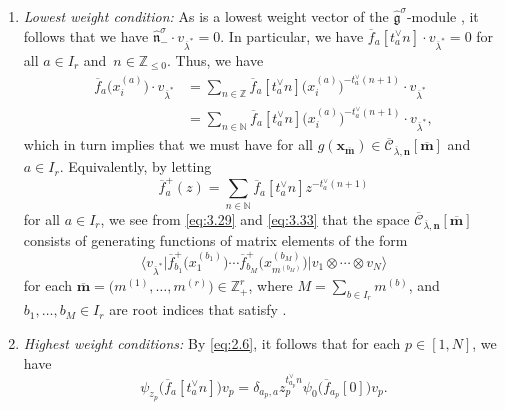 \documentclass[10pt,a4paper]{amsart}
\numberwithin{equation}{section}
\begin{document}
\begin{enumerate}
\item[$(2)$] \emph{Lowest weight condition:} As  is a lowest weight vector of the $\widehat{ \mathfrak{g}}^{\sigma}$-module , it follows that we have $\widehat{ \mathfrak{n}}_-^{\sigma}\cdot v_{\overline{ \lambda}^*}=0$. In particular, we have $\overline{f}_a [t_a^{\vee}n]\cdot v_{ \overline{\lambda}^*}=0$ for all $a\in I_r$ and~${n\in\mathbb{ Z}_{\leq0}}$. Thus, we have
\begin{align}
\overline{f}_a\bigl(x_i^{(a)}\bigr)\cdot v_{\overline{\lambda}^*}
&=\sum_{n\in\mathbb{Z}}\overline{f}_a[t_a^{\vee}n]\bigl(x_i^{(a)}\bigr)^{-t_a^{\vee}(n+1)}\cdot v_{\overline{\lambda}^*}\nonumber\\
&=\sum_{n\in\mathbb{N}}\overline{f}_a[t_a^{\vee}n]\bigl(x_i^{(a)}\bigr)^{-t_a^{\vee}(n+1)}\cdot v_{\overline{\lambda}^*},\label{eq:3.33}
\end{align}
which in turn implies that we must have
for all $g(\mathbf{x}_{\overline{\mathbf{m}}})\in\overline{ \mathcal{C}}_{\overline{\lambda},\mathbf{n}}[\overline{ \mathbf{m}}]$ and $a\in I_r$. Equivalently, by letting
\begin{equation}\label{eq:3.35}
\overline{f}_a^+(z)=
\sum_{n\in\mathbb{N}}\overline{f}_a[t_a^{\vee}n]z^{-t_a^{\vee}(n+1)}
\end{equation}
for all $a\in I_r$, we see from \eqref{eq:3.29} and \eqref{eq:3.33} that the space $\overline{\mathcal{C}}_{ \overline{\lambda},\mathbf{n}}[\overline{\mathbf{m}}]$ consists of generating functions of matrix elements of the form
\begin{equation}\label{eq:3.36}
\big\langle v_{\overline{\lambda}^*}\big|\overline{f}_{b_1}^+\bigl(x_1^{(b_1)}\bigr)\cdots\overline{f}_{b_M}^+\bigl(x_{m^{(b_M)}}^{(b_M)}\bigr) \big|v_1\otimes\cdots\otimes v_N\big\rangle
\end{equation}
for each $\overline{\mathbf{m}}=\bigl(m^{(1)},\dots,m^{(r)}\bigr)\in \mathbb{Z}_+^r$, where $M=\sum_{b\in I_r}m^{(b)}$, and $b_1,\dots,b_M\in I_r$ are root indices that satisfy .
\item[$(3)$] \emph{Highest weight conditions:} By \eqref{eq:2.6}, it follows that for each $p\in[1,N]$, we have
\begin{equation*}
\psi_{z_p}\bigl(\overline{f}_a[t_a^{\vee}n]\bigr)v_p =\delta_{a_p,a}z_p^{t_{a_p}^{\vee}n}\psi_0\bigl(\overline{f}_{a_p}[0]\bigr)v_p.

\end{equation*}
\end{enumerate}
\end{document}
